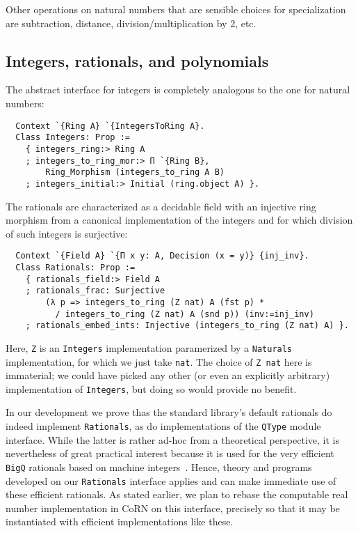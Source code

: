 \documentclass[a4paper,10pt,runningheads]{llncs}
\begin{document}
Other operations on natural numbers that are sensible choices for specialization are subtraction, distance, division/multiplication by 2, etc.

\subsection{Integers, rationals, and polynomials}

The abstract interface for integers is completely analogous to the one for natural numbers:
\begin{lstlisting}
  Context `{Ring A} `{IntegersToRing A}.
  Class Integers: Prop :=
    { integers_ring:> Ring A
    ; integers_to_ring_mor:> Π `{Ring B},
        Ring_Morphism (integers_to_ring A B)
    ; integers_initial:> Initial (ring.object A) }.
\end{lstlisting}

The rationals are characterized as a decidable field with an injective ring morphism from a canonical implementation of the integers and for which division of such integers is surjective:
\begin{lstlisting}
  Context `{Field A} `{Π x y: A, Decision (x = y)} {inj_inv}.
  Class Rationals: Prop :=
    { rationals_field:> Field A
    ; rationals_frac: Surjective
        (λ p => integers_to_ring (Z nat) A (fst p) *
          / integers_to_ring (Z nat) A (snd p)) (inv:=inj_inv)
    ; rationals_embed_ints: Injective (integers_to_ring (Z nat) A) }.
\end{lstlisting}
Here, \lstinline|Z| is an \lstinline|Integers| implementation paramerized by a \lstinline|Naturals| implementation, for which we just take \lstinline|nat|. The choice of \lstinline|Z nat| here is immaterial; we could have picked any other (or even an explicitly arbitrary) implementation of \lstinline|Integers|, but doing so would provide no benefit.


In our development we prove thas the standard library's default rationals do indeed implement \lstinline|Rationals|, as do implementations of the \lstinline|QType| module interface. While the latter is rather ad-hoc from a theoretical perspective, it is nevertheless of great practical interest because it is used for the very efficient \lstinline|BigQ| rationals based on machine integers~\cite{something}. Hence, theory and programs developed on our \lstinline|Rationals| interface applies and can make immediate use of these efficient rationals. As stated earlier, we plan to rebase the computable real number implementation in CoRN on this interface, precisely so that it may be instantiated with efficient implementations like these.
\end{document}
